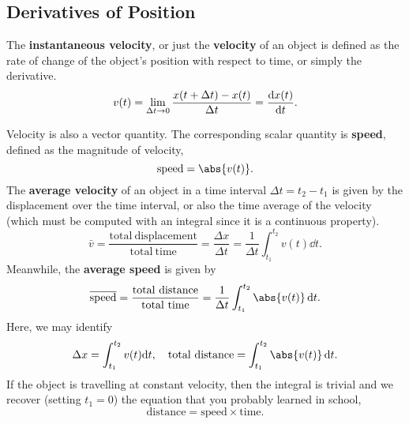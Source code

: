 \documentclass[../classical_mechanics.tex]{subfiles}
\begin{document}
        \subsection{Derivatives of Position}\label{subsec:derivatives-of-position}
            \begin{definition}
                The \textbf{instantaneous velocity}, or just the \textbf{velocity} of an object is defined as the rate of change of the object's position with respect to time, or simply the derivative.
                \begin{equation}
                    v(t)=\lim_{\Delta t\to0}\frac{x(t+\Delta t)-x(t)}{\Delta t}=\dv{x(t)}{t}.
                \end{equation}
            \end{definition}
            Velocity is also a vector quantity.
            The corresponding scalar quantity is \textbf{speed}, defined as the magnitude of velocity,
            \begin{equation}
                \mathrm{speed}=\abs{v(t)}.
            \end{equation}
            The \textbf{average velocity} of an object in a time interval $\Delta t=t_2-t_1$ is given by the displacement over the time interval, or also the time average of the velocity (which must be computed with an integral since it is a continuous property).
            \begin{equation}
                \bar{v}=\frac{\mathrm{total\ displacement}}{\mathrm{total\ time}}=\frac{\Delta x}{\Delta t}=\frac{1}{\Delta t}\int_{t_1}^{t_2}v(t)\dd{t}.
            \end{equation}
            Meanwhile, the \textbf{average speed} is given by
            \begin{equation}
                \overline{\mathrm{speed}}=\frac{\mathrm{total\ distance}}{\mathrm{total\ time}}=\frac{1}{\Delta t}\int_{t_1}^{t_2}\abs{v(t)}\dd{t}.
            \end{equation}
            Here, we may identify
            \begin{equation}\label{eq:total-disp}
                \Delta x=\int_{t_1}^{t_2}v(t)\mathrm{d}t,\quad \mathrm{total\ distance}=\int_{t_1}^{t_2}\abs{v(t)}\dd{t}.
            \end{equation}
            If the object is travelling at constant velocity, then the integral is trivial and we recover (setting $t_1=0$) the equation that you probably learned in school,
            \begin{equation}
                \mathrm{distance}=\mathrm{speed}\times\mathrm{time}.
            \end{equation}
\end{document}
